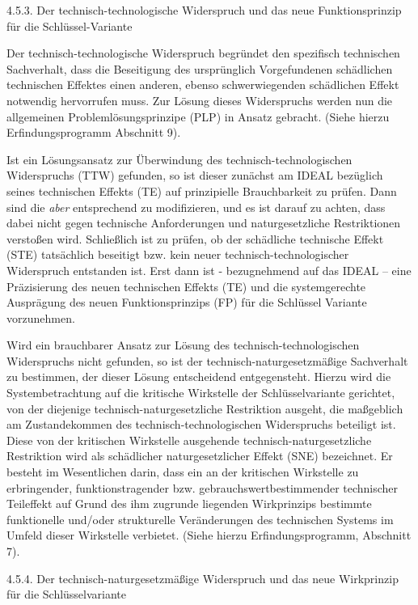 \documentclass[12pt,a4paper]{article}
\begin{document}
4.5.3. Der technisch-technologische Widerspruch und das neue Funktionsprinzip
für die Schlüssel-Variante

Der technisch-technologische Widerspruch begründet den spezifisch technischen
Sachverhalt, dass die Beseitigung des ursprünglich Vorgefundenen schädlichen
technischen Effektes einen anderen, ebenso schwerwiegenden schädlichen Effekt
notwendig hervorrufen muss. Zur Lösung dieses Widerspruchs werden nun die
allgemeinen Problemlösungsprinzipe (PLP) in Ansatz gebracht. (Siehe hierzu
Erfindungsprogramm Abschnitt 9).

Ist ein Lösungsansatz zur Überwindung des technisch-technologischen
Widerspruchs (TTW) gefunden, so ist dieser zunächst am IDEAL bezüglich seines
technischen Effekts (TE) auf prinzipielle Brauchbarkeit zu prüfen. Dann sind
die \emph{aber} entsprechend zu modifizieren, und es ist darauf zu achten,
dass dabei nicht gegen technische Anforderungen und naturgesetzliche
Restriktionen verstoßen wird. Schließlich ist zu prüfen, ob der schädliche
technische Effekt (STE) tatsächlich beseitigt bzw. kein neuer
technisch-technologischer Widerspruch entstanden ist. Erst dann ist -
bezugnehmend auf das IDEAL -- eine Präzisierung des neuen technischen Effekts
(TE) und die systemgerechte Ausprägung des neuen Funktionsprinzips (FP) für
die Schlüssel Variante vorzunehmen.

Wird ein brauchbarer Ansatz zur Lösung des technisch-technologischen
Widerspruchs nicht gefunden, so ist der technisch-naturgesetzmäßige
Sachverhalt zu bestimmen, der dieser Lösung entscheidend entgegensteht. Hierzu
wird die Systembetrachtung auf die kritische Wirkstelle der Schlüsselvariante
gerichtet, von der diejenige technisch-naturgesetzliche Restriktion ausgeht,
die maßgeblich am Zustandekommen des technisch-technologischen Widerspruchs
beteiligt ist. Diese von der kritischen Wirkstelle ausgehende
technisch-naturgesetzliche Restriktion wird als schädlicher naturgesetzlicher
Effekt (SNE) bezeichnet. Er besteht im Wesentlichen darin, dass ein an der
kritischen Wirkstelle zu erbringender, funktionstragender
bzw. gebrauchswertbestimmender technischer Teileffekt auf Grund des ihm
zugrunde liegenden Wirkprinzips bestimmte funktionelle und/oder strukturelle
Veränderungen des technischen Systems im Umfeld dieser Wirkstelle
verbietet. (Siehe hierzu Erfindungsprogramm, Abschnitt 7).


4.5.4.  Der technisch-naturgesetzmäßige Widerspruch und das neue Wirkprinzip
für die Schlüsselvariante
\end{document}
